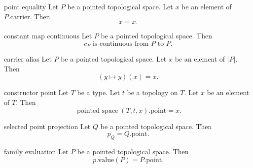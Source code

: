 \begin{cleanresult}{point equality}
Let $P$ be a pointed topological space.
Let $x$ be an element of $P.\mathrm{carrier}$.
Then \[x = x.\]
\end{cleanresult}

\begin{cleanresult}{constant map continuous}
Let $P$ be a pointed topological space.
Then \[c_{P}\text{ is continuous from }P\text{ to }P.\]
\end{cleanresult}

\begin{cleanresult}{carrier alias}
Let $P$ be a pointed topological space.
Let $x$ be an element of $\lvert P\rvert$.
Then \[\left(y \mapsto y\right)(x) = x.\]
\end{cleanresult}

\begin{cleanresult}{constructor point}
Let $T$ be a type.
Let $t$ be a topology on $T$.
Let $x$ be an element of $T$.
Then \[\operatorname{pointed\ space}(T, t, x).\mathrm{point} = x.\]
\end{cleanresult}

\begin{cleanresult}{selected point projection}
Let $Q$ be a pointed topological space.
Then \[p_{Q} = Q.\mathrm{point}.\]
\end{cleanresult}

\begin{cleanresult}{family evaluation}
Let $P$ be a pointed topological space.
Then \[p.\mathrm{value}(P) = P.\mathrm{point}.\]
\end{cleanresult}

